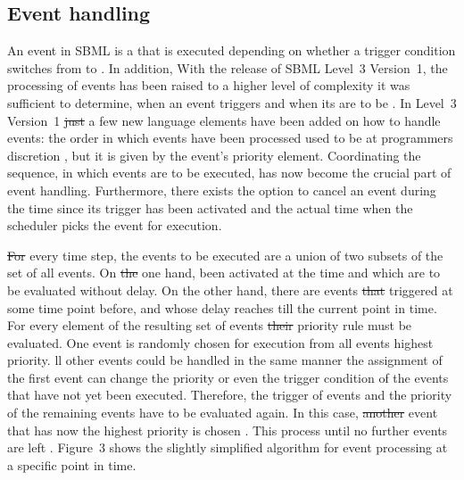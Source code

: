 \documentclass[10pt]{bmc_article}
\newenvironment{bmcformat}{\fussy\setboolean{publ}{true}}{\fussy}
\begin{document}
\begin{bmcformat}
\subsection*{Event handling}
An event in \acs{SBML} is a  that is executed depending on whether a trigger 
condition switches from \false to \true.
In addition, 
With the release of \acs{SBML} Level~3 Version~1, the processing of events has been
raised to a higher level of complexity\COR{:}
 it was sufficient to determine, when an event triggers and when its  are to be .
In Level~3 Version~1 \sout{just} a few new language elements have been
added on how to handle events:
 the order\COR{,} in which events have been processed\COR{,} used to be at programmers discretion ,
but  it is given by the event's priority element.
Coordinating the sequence, in which events are to be executed, has now become the crucial part of event handling. 
Furthermore, there exists the option to cancel an event during the time since its trigger 
has been activated and the actual time when the scheduler picks the event for execution.

\sout{For} every time step, the events to be executed are a union of two subsets of the set of all events.
On \sout{the} one hand,  been activated at the  time and which are to be evaluated without delay.
On the other hand, there are events \sout{that} triggered at some time point before, and whose delay reaches till the current point in time.
For every element of the resulting set of events\sout{ their} priority rule must be evaluated.
One event is randomly chosen for execution from all events  highest priority.
ll other events could be handled in the same manner
the assignment of the first event can change the priority or even the trigger condition of the events that have not yet been executed.
Therefore, the trigger of  events and the priority of the remaining events have to be evaluated again.
In this case, \sout{another} event that has now the highest priority is chosen .
This process  until no further events are left .
Figure~3 shows the slightly simplified algorithm for event processing at a specific point in time.


\end{bmcformat}
\end{document}

